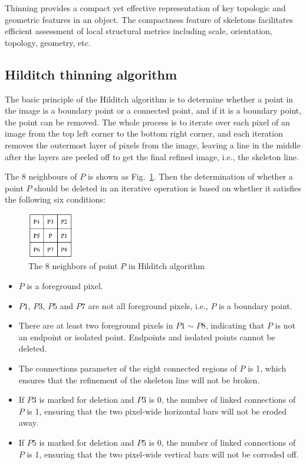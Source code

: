 \documentclass[hyperref]{article}
\theoremstyle{nonumberplain}
\begin{document}
	Thinning provides a compact yet effective representation of key topologic and geometric features in an object. The compactness feature of skeletons facilitates efficient assessment of local structural metrics including scale, orientation, topology, geometry, etc.
	
	\subsection{Hilditch thinning algorithm}
	
	\hspace{1.0em}
	The basic principle of the Hilditch algorithm is to determine whether a point in the image is a boundary point or a connected point, and if it is a boundary point, the point can be removed. The whole process is to iterate over each pixel of an image from the top left corner to the bottom right corner, and each iteration removes the outermost layer of pixels from the image, leaving a line in the middle after the layers are peeled off to get the final refined image, i.e., the skeleton line.
	
	The 8 neighbours of $P$ is shown as Fig.~\ref{fig10}. Then the determination of whether a point $P$ should be deleted in an iterative operation is based on whether it satisfies the following six conditions:
	
	\begin{figure}[htbp]
		\centering
		\centering
		\includegraphics[width=2cm]{Hilditch.png}
		\caption{The 8 neighbors of point $P$ in Hilditch algorithm}
		\label{fig10}
	\end{figure}
	
	\begin{itemize}
		\item $P$ is a foreground pixel.
		\item $P1$, $P3$, $P5$ and $P7$ are not all foreground pixels, i.e., $P$ is a boundary point.
		\item There are at least two foreground pixels in $P1\sim P8$, indicating that $P$ is not an endpoint or isolated point. Endpoints and isolated points cannot be deleted.
		\item The connections parameter of the eight connected regions of $P$ is 1, which ensures that the refinement of the skeleton line will not be broken.
		\item If $P3$ is marked for deletion and $P3$ is 0, the number of linked connections of $P$ is 1, ensuring that the two pixel-wide horizontal bars will not be eroded away.
		\item If $P5$ is marked for deletion and $P5$ is 0, the number of linked connections of $P$ is 1, ensuring that the two pixel-wide vertical bars will not be corroded off.
	\end{itemize}
	
\end{document}
